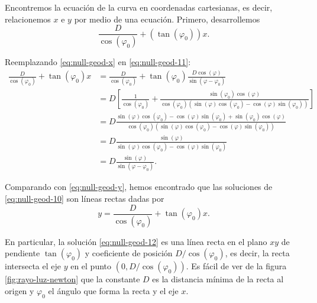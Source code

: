 \documentclass[letterpaper,11pt]{article}
\begin{document}
Encontremos la ecuación de la curva en coordenadas cartesianas, es decir, relacionemos $x$ e $y$ por medio de una ecuación. Primero, desarrollemos
\begin{equation}
\frac{D}{\cos(\varphi_0)} + (\tan(\varphi_0)) x. \label{eq:null-geod-11}
\end{equation}

Reemplazando \eqref{eq:null-geod-x} en \eqref{eq:null-geod-11}:
\begin{align}
\frac{D}{\cos(\varphi_0)} + \tan(\varphi_0) x &= \frac{D}{\cos(\varphi_0)} + \tan(\varphi_0) \frac{D\cos(\varphi)}{\sin(\varphi-\varphi_0)} \nonumber\\
&= D\left[ \frac{1}{\cos(\varphi_0)} + \frac{\sin(\varphi_0)\cos(\varphi)}{\cos(\varphi_0)(\sin(\varphi)\cos(\varphi_0) - \cos(\varphi)\sin(\varphi_0))} \right] \nonumber\\
&= D \frac{\sin(\varphi)\cos(\varphi_0) - \cos(\varphi)\sin(\varphi_0) + \sin(\varphi_0)\cos(\varphi)}{\cos(\varphi_0)(\sin(\varphi)\cos(\varphi_0) - \cos(\varphi)\sin(\varphi_0))}\nonumber \\
&= D \frac{\sin(\varphi)}{\sin(\varphi)\cos(\varphi_0) - \cos(\varphi)\sin(\varphi_0)} \nonumber\\
&= D  \frac{\sin(\varphi)}{\sin(\varphi-\varphi_0)}.
\end{align}

Comparando con \eqref{eq:null-geod-y}, hemos encontrado que las soluciones de \eqref{eq:null-geod-10} son líneas rectas dadas por 
\begin{equation} \label{eq:null-geod-12}
y = \frac{D}{\cos(\varphi_0)} + \tan(\varphi_0) x.
\end{equation}

En particular, la solución \eqref{eq:null-geod-12} es una línea recta en el plano $xy$ de pendiente $\tan(\varphi_0)$ y coeficiente de posición $D/\cos(\varphi_0)$, es decir, la recta intersecta el eje $y$ en el punto $(0,D/\cos(\varphi_0))$. Es fácil de ver de la figura \ref{fig:rayo-luz-newton} que la constante $D$ es la distancia mínima de la recta al origen y $\varphi_0$ el ángulo que forma la recta y el eje $x$.
\end{document}
